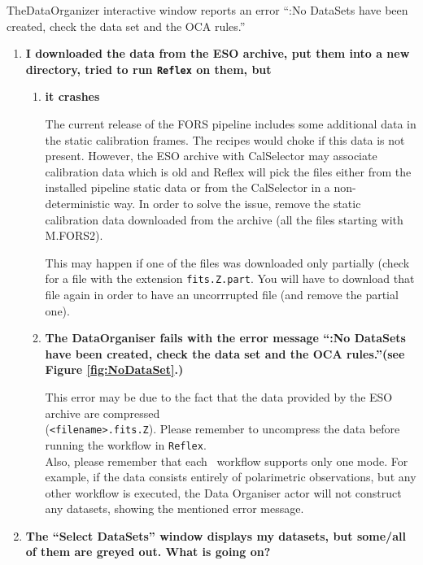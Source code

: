 \documentclass[pdftex,a4paper,twoside,11pt]{article}
\begin{document}
{TheDataOrganizer interactive window reports an error 
  ``:No DataSets have been created, check the data set and the OCA rules.''}
\begin{enumerate}
\item  {\bf I downloaded the data from the ESO archive, put them into
  a new directory, tried to run {\tt Reflex} on them, but}
\begin{enumerate}
\item {\bf it crashes}

The current release of the FORS pipeline includes some additional data in the static
calibration frames. The recipes would choke if this data is not present. 
However, the ESO archive with CalSelector may associate calibration data which
is old and Reflex will pick the files either from the installed pipeline
static data or from the CalSelector in a non-deterministic way. In order to 
solve the issue, remove the static calibration data downloaded from the archive
(all the files starting with M.FORS2).

This may happen if one of the files was downloaded only partially
(check for a file with the extension {\tt fits.Z.part}. You will have to
download that file again in order to have an uncorrrupted file (and
remove the partial one).

\item {\bf The DataOrganiser fails with the error message 
 ``:No DataSets have been created, check the data set and the OCA rules.''(see
  Figure \ref{fig:NoDataSet}.)}

This error may be due to the fact that the data provided by the ESO
archive are compressed\\ ({\tt <filename>.fits.Z}).  Please 
remember to uncompress the data before running the workflow in 
{\tt Reflex}.\\[2mm]

Also, please remember that each \instrument\ workflow supports only one mode.
For example, if the data consists entirely of polarimetric observations,
but any other workflow is executed, the Data Organiser actor will not
construct any datasets, showing the mentioned error message.
\end{enumerate}

\item {\bf The ``Select DataSets'' window displays my datasets, but
  some/all of them are greyed out. What is going on?}


\end{enumerate}
\end{document}
